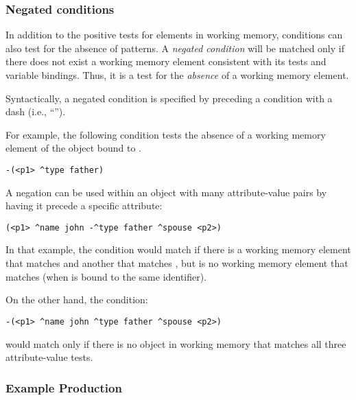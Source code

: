 \subsubsection{Negated conditions}
\label{SYNTAX-pm-lhs-negated}
\index{-}

In addition to the positive tests for elements in working memory, conditions can also test for the absence of patterns.  A \emph{negated condition} will be matched only if there does not exist a working memory element consistent with its tests and variable bindings. Thus, it is a test for the \textit{absence} of a working memory element.

Syntactically, a negated condition is specified by preceding a condition with a dash (i.e., ``\soar{-}'').

For example, the following condition tests the absence of a working memory element of the object bound to .

\begin{verbatim}
-(<p1> ^type father)
\end{verbatim}
\vspace{12pt}

A negation can be used within an object with many attribute-value pairs by having it precede a specific attribute:

\begin{verbatim}
(<p1> ^name john -^type father ^spouse <p2>)
\end{verbatim} \vspace{12pt}

In that example, the condition would match if there is a working memory element that matches  and another that matches , but is no working memory element that matches  (when  is bound to the same identifier).

On the other hand, the condition:

\begin{verbatim}
-(<p1> ^name john ^type father ^spouse <p2>)
\end{verbatim}

would match only if there is no object in working memory that matches all three attribute-value tests.

\subsubsection*{Example Production}

